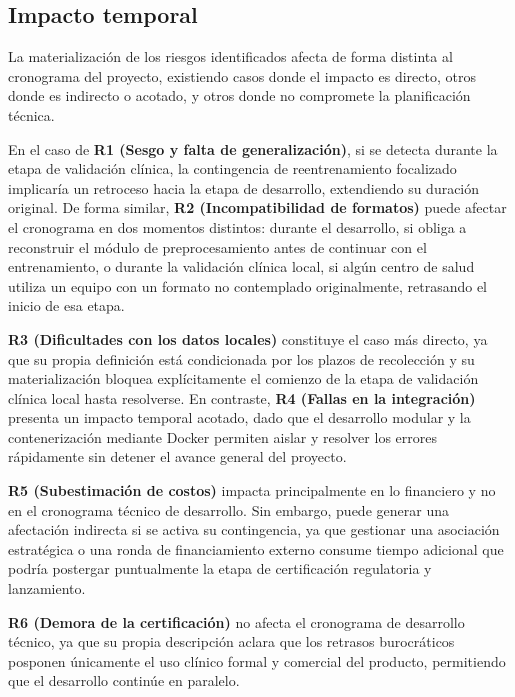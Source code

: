         \subsection{Impacto temporal}

            La materialización de los riesgos identificados afecta de forma distinta al cronograma del proyecto, existiendo casos donde el impacto es directo, otros donde es indirecto o acotado, y otros donde no compromete la planificación técnica.
            
            En el caso de \textbf{R1 (Sesgo y falta de generalización)}, si se detecta durante la etapa de validación clínica, la contingencia de reentrenamiento focalizado implicaría un retroceso hacia la etapa de desarrollo, extendiendo su duración original. De forma similar, \textbf{R2 (Incompatibilidad de formatos)} puede afectar el cronograma en dos momentos distintos: durante el desarrollo, si obliga a reconstruir el módulo de preprocesamiento antes de continuar con el entrenamiento, o durante la validación clínica local, si algún centro de salud utiliza un equipo con un formato no contemplado originalmente, retrasando el inicio de esa etapa. 
            
            \textbf{R3 (Dificultades con los datos locales)} constituye el caso más directo, ya que su propia definición está condicionada por los plazos de recolección y su materialización bloquea explícitamente el comienzo de la etapa de validación clínica local hasta resolverse. En contraste, \textbf{R4 (Fallas en la integración)} presenta un impacto temporal acotado, dado que el desarrollo modular y la contenerización mediante Docker permiten aislar y resolver los errores rápidamente sin detener el avance general del proyecto. 
            
            \textbf{R5 (Subestimación de costos)} impacta principalmente en lo financiero y no en el cronograma técnico de desarrollo. Sin embargo, puede generar una afectación indirecta si se activa su contingencia, ya que gestionar una asociación estratégica o una ronda de financiamiento externo consume tiempo adicional que podría postergar puntualmente la etapa de certificación regulatoria y lanzamiento.
            
            \textbf{R6 (Demora de la certificación)} no afecta el cronograma de desarrollo técnico, ya que su propia descripción aclara que los retrasos burocráticos posponen únicamente el uso clínico formal y comercial del producto, permitiendo que el desarrollo continúe en paralelo. 
            
